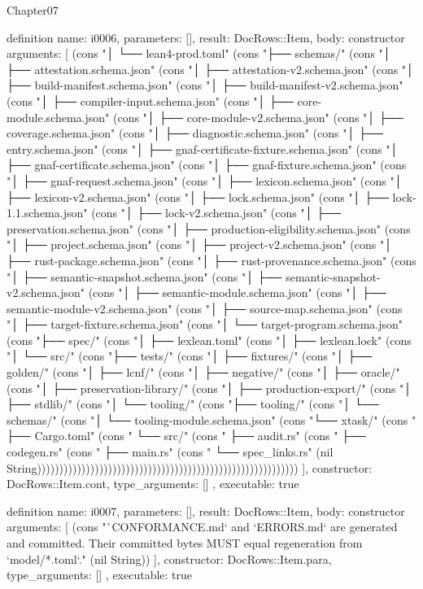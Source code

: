 \begin{lexlean}{Chapter07}
\begin{semanticmodule}
definition{
  name: i0006,
  parameters: [],
  result: DocRows::Item,
  body: constructor{
    arguments: [
      (cons "│   └── lean4-prod.toml" (cons "├── schemas/" (cons "│   ├── attestation.schema.json" (cons "│   ├── attestation-v2.schema.json" (cons "│   ├── build-manifest.schema.json" (cons "│   ├── build-manifest-v2.schema.json" (cons "│   ├── compiler-input.schema.json" (cons "│   ├── core-module.schema.json" (cons "│   ├── core-module-v2.schema.json" (cons "│   ├── coverage.schema.json" (cons "│   ├── diagnostic.schema.json" (cons "│   ├── entry.schema.json" (cons "│   ├── gnaf-certificate-fixture.schema.json" (cons "│   ├── gnaf-certificate.schema.json" (cons "│   ├── gnaf-fixture.schema.json" (cons "│   ├── gnaf-request.schema.json" (cons "│   ├── lexicon.schema.json" (cons "│   ├── lexicon-v2.schema.json" (cons "│   ├── lock.schema.json" (cons "│   ├── lock-1.1.schema.json" (cons "│   ├── lock-v2.schema.json" (cons "│   ├── preservation.schema.json" (cons "│   ├── production-eligibility.schema.json" (cons "│   ├── project.schema.json" (cons "│   ├── project-v2.schema.json" (cons "│   ├── rust-package.schema.json" (cons "│   ├── rust-provenance.schema.json" (cons "│   ├── semantic-snapshot.schema.json" (cons "│   ├── semantic-snapshot-v2.schema.json" (cons "│   ├── semantic-module.schema.json" (cons "│   ├── semantic-module-v2.schema.json" (cons "│   ├── source-map.schema.json" (cons "│   ├── target-fixture.schema.json" (cons "│   └── target-program.schema.json" (cons "├── spec/" (cons "│   ├── lexlean.toml" (cons "│   ├── lexlean.lock" (cons "│   └── src/" (cons "├── tests/" (cons "│   ├── fixtures/" (cons "│   ├── golden/" (cons "│   ├── lcnf/" (cons "│   ├── negative/" (cons "│   ├── oracle/" (cons "│   ├── preservation-library/" (cons "│   ├── production-export/" (cons "│   ├── stdlib/" (cons "│   └── tooling/" (cons "├── tooling/" (cons "│   └── schemas/" (cons "│       └── tooling-module.schema.json" (cons "└── xtask/" (cons "    ├── Cargo.toml" (cons "    └── src/" (cons "        ├── audit.rs" (cons "        ├── codegen.rs" (cons "        ├── main.rs" (cons "        └── spec_links.rs" (nil String)))))))))))))))))))))))))))))))))))))))))))))))))))))))))))
    ],
    constructor: DocRows::Item.cont,
    type_arguments: []
  },
  executable: true
}

definition{
  name: i0007,
  parameters: [],
  result: DocRows::Item,
  body: constructor{
    arguments: [
      (cons "`CONFORMANCE.md` and `ERRORS.md` are generated and committed. Their committed bytes MUST equal regeneration from `model/*.toml`." (nil String))
    ],
    constructor: DocRows::Item.para,
    type_arguments: []
  },
  executable: true
}


\end{semanticmodule}
\end{lexlean}
